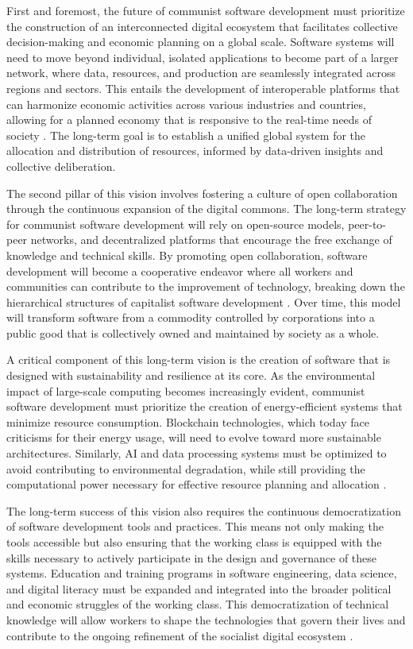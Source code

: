 \begin{refsection}
First and foremost, the future of communist software development must prioritize the construction of an interconnected digital ecosystem that facilitates collective decision-making and economic planning on a global scale. Software systems will need to move beyond individual, isolated applications to become part of a larger network, where data, resources, and production are seamlessly integrated across regions and sectors. This entails the development of interoperable platforms that can harmonize economic activities across various industries and countries, allowing for a planned economy that is responsive to the real-time needs of society \cite[pp.~162-164]{cockshott1993}. The long-term goal is to establish a unified global system for the allocation and distribution of resources, informed by data-driven insights and collective deliberation.

The second pillar of this vision involves fostering a culture of open collaboration through the continuous expansion of the digital commons. The long-term strategy for communist software development will rely on open-source models, peer-to-peer networks, and decentralized platforms that encourage the free exchange of knowledge and technical skills. By promoting open collaboration, software development will become a cooperative endeavor where all workers and communities can contribute to the improvement of technology, breaking down the hierarchical structures of capitalist software development \cite[pp.~43-45]{hardt2017}. Over time, this model will transform software from a commodity controlled by corporations into a public good that is collectively owned and maintained by society as a whole.

A critical component of this long-term vision is the creation of software that is designed with sustainability and resilience at its core. As the environmental impact of large-scale computing becomes increasingly evident, communist software development must prioritize the creation of energy-efficient systems that minimize resource consumption. Blockchain technologies, which today face criticisms for their energy usage, will need to evolve toward more sustainable architectures. Similarly, AI and data processing systems must be optimized to avoid contributing to environmental degradation, while still providing the computational power necessary for effective resource planning and allocation \cite[pp.~115-117]{swartz2012}.

The long-term success of this vision also requires the continuous democratization of software development tools and practices. This means not only making the tools accessible but also ensuring that the working class is equipped with the skills necessary to actively participate in the design and governance of these systems. Education and training programs in software engineering, data science, and digital literacy must be expanded and integrated into the broader political and economic struggles of the working class. This democratization of technical knowledge will allow workers to shape the technologies that govern their lives and contribute to the ongoing refinement of the socialist digital ecosystem \cite[pp.~98-100]{schweickart2002}.


\end{refsection}
